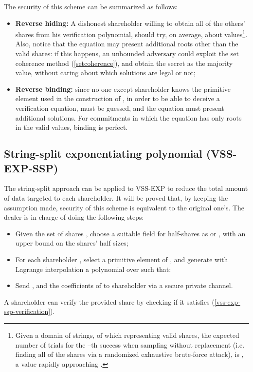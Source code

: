 \documentclass[10pt,journal,cspaper,compsoc]{IEEEtran}
\begin{document}
The security of this scheme can be summarized as follows:
\begin{itemize}
\item \textbf{Reverse hiding:} A dishonest shareholder willing to obtain all of the others' shares from his verification polynomial, should try, on average, about  values\footnote{Given a domain of  strings,  of which representing valid shares, the expected number of trials for the --th success when sampling without replacement (i.e. finding all of the shares via a randomized exhaustive brute-force attack), is , a value rapidly approaching .}.
Also, notice that the equation may present additional roots other than the valid shares: if this happens, an unbounded adversary could exploit the set coherence method (\ref{setcoherence}), and obtain the secret as the majority value, without caring about which solutions are legal or not;
\item \textbf{Reverse binding:} since no one except shareholder  knows the primitive element  used in the construction of , in order to be able to deceive a verification equation,  must be guessed, and the equation must present additional solutions. For commitments in which the equation has only roots in the valid values, binding is perfect.
\end{itemize}

\subsection{String-split exponentiating polynomial (VSS-EXP-SSP)}
The string-split approach can be applied to VSS-EXP to reduce the total amount of data targeted to each shareholder. It will be proved that, by keeping the assumption made, security of this scheme is equivalent to the original one's. The dealer is in charge of doing the following steps:

\begin{itemize}
\item Given the set of shares , choose a suitable field  for half-shares  as  or , with  an upper bound on the shares' half sizes;
\item For each shareholder , select a primitive element  of , and generate with Lagrange interpolation a polynomial  over  such that:

\item Send ,  and the coefficients of  to shareholder  via a secure private channel.
\end{itemize}

A shareholder can verify the provided share by checking if it satisfies (\ref{vss-exp-ssp-verification}).\\
\end{document}
